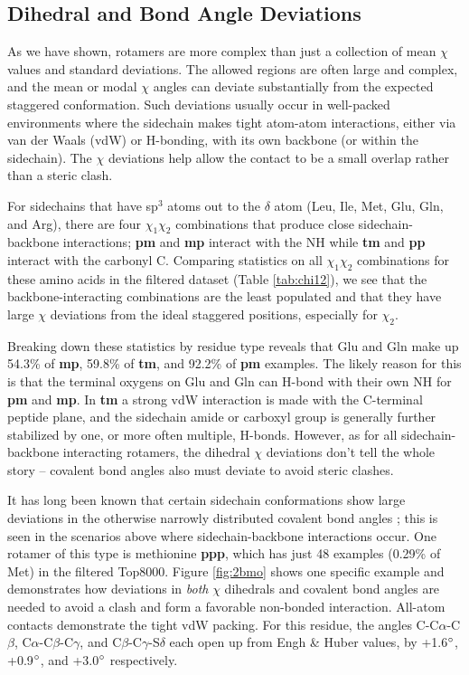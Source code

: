 \subsection{Dihedral and Bond Angle Deviations}
As we have shown, rotamers are more complex than just a collection of mean $\chi$ values and standard deviations. The allowed regions are often large and complex, and the mean or modal $\chi$ angles can \textcolor{changecolor}{deviate substantially from the expected staggered conformation}. Such deviations usually occur in well-packed environments where the sidechain makes \textcolor{changecolor}{tight atom-atom} interactions, either via van der Waals (vdW) or H-bonding, with its own backbone (or within the sidechain). The $\chi$ deviations help allow the contact to be \textcolor{changecolor}{a small overlap} rather than a steric clash.

For sidechains that have sp$^{3}$ atoms out to the $\delta$ atom (Leu, Ile, Met, Glu, Gln, and Arg), there are four $\chi_{1}\chi_{2}$ combinations that produce close sidechain-backbone interactions; \textbf{pm} and \textbf{mp} interact with the NH while \textbf{tm} and \textbf{pp} interact with the carbonyl C. Comparing statistics on all $\chi_{1}\chi_{2}$ combinations for these amino acids in the filtered dataset (Table \ref{tab:chi12}), we see that the backbone-interacting combinations are the least populated and that they have large $\chi$ deviations from the ideal staggered positions, especially for $\chi_{2}$. 

Breaking down these statistics by residue type reveals that Glu and Gln make up 54.3\% of \textbf{mp}, 59.8\% of \textbf{tm}, and 92.2\% of \textbf{pm} examples. The likely reason for this is that the terminal oxygens on Glu and Gln can H-bond with their own NH for \textbf{pm} and \textbf{mp}. In \textbf{tm} a strong vdW interaction is made with the C-terminal peptide plane, and the sidechain amide or carboxyl group is generally further stabilized by one, or more often multiple, H-bonds. However, as for all sidechain-backbone interacting rotamers, the dihedral $\chi$ deviations don't tell the whole story -- covalent bond angles also must deviate to avoid steric clashes.

It has long been known that certain sidechain conformations show large deviations in the otherwise narrowly distributed covalent bond angles \cite{lovell2000penultimate}; this is seen in the scenarios above where sidechain-backbone interactions occur. One rotamer of this type is methionine \textbf{ppp}, which has just 48 examples (0.29\% of Met) in the filtered Top8000. Figure \ref{fig:2bmo} shows one specific example and demonstrates how deviations in \textit{both} $\chi$ dihedrals and covalent bond angles are needed to avoid a clash and form a favorable non-bonded interaction. All-atom contacts demonstrate the tight vdW packing. For this residue, the angles C-C$\alpha$-C$\beta$, C$\alpha$-C$\beta$-C$\gamma$, and C$\beta$-C$\gamma$-S$\delta$ each open up from Engh \& Huber values, by +1.6$\degree$, +0.9$\degree$, and +3.0$\degree$ respectively.


